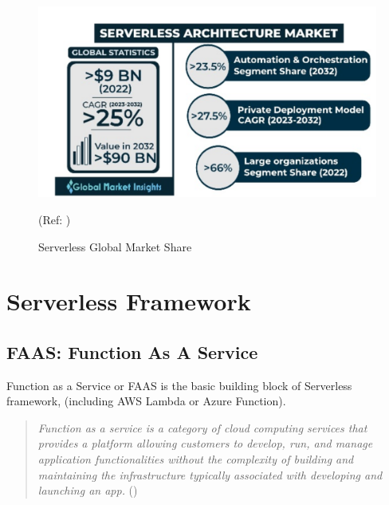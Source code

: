 \documentclass{article}
\begin{document}
\begin{figure}[h]
    \centering
    \includegraphics[width=0.5\linewidth]{images/Serverless-Arch-market.PNG}
    \caption{Serverless Global Market Share}
    \label{Serverless_global_market_share}
    (Ref: \cite{GMI_3796_2022} )
\end{figure}

\pagebreak

\section{Serverless Framework}
\subsection{FAAS: Function As A Service}
\par
\justifying
Function as a Service or \gls{FAAS} is the basic building block of Serverless framework, (including AWS Lambda or Azure Function). 
\begin{quote}
\begin{flushleft}
\textit{Function as a service is a category of cloud computing services that provides a platform allowing customers to develop, run, and manage application functionalities without the complexity of building and maintaining the infrastructure typically associated with developing and launching an app.}
\hfill \break
(\cite{Wiki_function_as_a_service})
\end{flushleft}
\end{quote}
\end{document}
